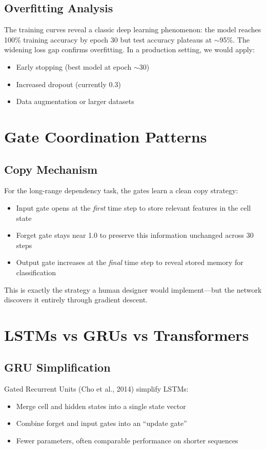 \documentclass[12pt]{article}
\begin{document}
\subsection*{Overfitting Analysis}
The training curves reveal a classic deep learning phenomenon: the model reaches 100\% training accuracy by epoch 30 but test accuracy plateaus at $\sim$95\%. The widening loss gap confirms overfitting. In a production setting, we would apply:
\begin{itemize}
    \item Early stopping (best model at epoch $\sim$30)
    \item Increased dropout (currently 0.3)
    \item Data augmentation or larger datasets
\end{itemize}

\section*{Gate Coordination Patterns}

\subsection*{Copy Mechanism}
For the long-range dependency task, the gates learn a clean copy strategy:
\begin{itemize}
    \item Input gate opens at the \textit{first} time step to store relevant features in the cell state
    \item Forget gate stays near 1.0 to preserve this information unchanged across 30 steps
    \item Output gate increases at the \textit{final} time step to reveal stored memory for classification
\end{itemize}

This is exactly the strategy a human designer would implement---but the network discovers it entirely through gradient descent.

\section*{LSTMs vs GRUs vs Transformers}

\subsection*{GRU Simplification}
Gated Recurrent Units (Cho et al., 2014) simplify LSTMs:
\begin{itemize}
    \item Merge cell and hidden states into a single state vector
    \item Combine forget and input gates into an ``update gate''
    \item Fewer parameters, often comparable performance on shorter sequences
\end{itemize}
\end{document}
